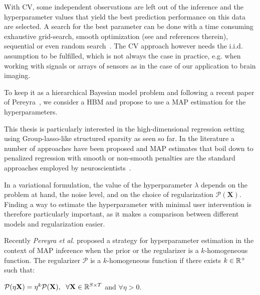 With \ac{CV}, some independent observations are left out of the inference and the
hyperparameter values that yield the best prediction performance on this data are selected. A search for the best parameter can be done with a time consuming exhaustive grid-search, smooth optimization (see \cite{pedregosa2016hyperparameter} and references therein), sequential or even random search~\cite{bergstra2011algorithms, bergstra2012random}. The \ac{CV} approach however needs the i.i.d. assumption to be fulfilled, which is not always the case in practice, e.g. when working with signals or arrays of sensors as in the case of our application to brain imaging.

To keep it as a hierarchical Bayesian model problem and following a recent paper of Pereyra~\cite{Figueiredo}, we consider a \ac{HBM} and propose to use a \ac{MAP} estimation for the hyperparameters.

This thesis is particularly interested in the high-dimensional regression setting using Group-\ac{lasso}-like structured sparsity as seen so far. In the literature a number of approaches have been proposed and MAP estimates that boil down to penalized regression with smooth or non-smooth penalties are the standard approaches employed by neuroscientists~\cite{haufe2008combining,ou2009distributed, bolstad2009space, wipf2009unified,gramfort2012mixed,lucka2012hierarchical,valdes2009eeg}.

In a variational formulation, the value of the hyperparameter $\lambda$ depends on the problem at hand, the noise level, and on the choice of regularization $\mathcal{P}(\mathbf{X})$.
Finding a way to estimate the hyperparameter with minimal user intervention is therefore particularly important, as it makes a comparison between different models and regularization easier.

Recently \textit{Pereyra et al.} \cite{Figueiredo} proposed a strategy for hyperparameter estimation in the context of MAP inference when the prior or the regularizer is a $k$-homogeneous function. The regularizer $\mathcal{P}$ is a $k$-homogeneous function if there exists $k\in\mathbb{R}^+$ such that:\\
\begin{center}
 $\mathcal{P}(\eta \mathbf{X}) = \eta^k\mathcal{P}(\mathbf{X}),
 \hspace{6pt} \forall \mathbf{X}\in\mathbb{R}^{S\times T}$  \hspace{4pt} and \hspace{4pt}  $\forall \eta > 0$.
 \end{center}

